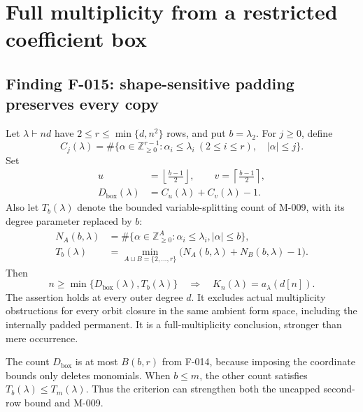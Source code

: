 \section{Full multiplicity from a restricted coefficient box}

\subsection*{Finding F-015: shape-sensitive padding preserves every copy}
Let \(\lambda\vdash nd\) have \(2\leq r\leq\min\{d,n^2\}\)
rows, and put \(b=\lambda_2\). For \(j\geq0\), define
\[
 C_j(\lambda)=\#\{\alpha\in\mathbb Z_{\geq0}^{r-1}:
       \alpha_i\leq\lambda_i\ (2\leq i\leq r),\quad
       |\alpha|\leq j\}.
\]
Set
\[
 \begin{split}
 u&=\left\lfloor\frac{b-1}{2}\right\rfloor,\qquad
 v=\left\lceil\frac{b-1}{2}\right\rceil,\\
 D_{\mathrm{box}}(\lambda)&=C_u(\lambda)+C_v(\lambda)-1.
 \end{split}
\]
Also let \(T_b(\lambda)\) denote the bounded variable-splitting
count of M-009, with its degree parameter replaced by \(b\):
\[
 \begin{split}
 N_A(b,\lambda)&=
 \#\{\alpha\in\mathbb Z_{\geq0}^{A}:\alpha_i\leq\lambda_i,
                                            |\alpha|\leq b\},\\
 T_b(\lambda)&=
 \min_{A\sqcup B=\{2,\ldots,r\}}
                  \bigl(N_A(b,\lambda)+N_B(b,\lambda)-1\bigr).
 \end{split}
\]
Then
\begin{equation}\label{eq:F015}
 n\geq\min\{D_{\mathrm{box}}(\lambda),T_b(\lambda)\}
 \quad\Longrightarrow\quad
                       K_n(\lambda)=a_\lambda(d[n]).
\end{equation}
The assertion holds at every outer degree \(d\). It excludes
actual multiplicity obstructions for every orbit closure in the
same ambient form space, including the internally padded permanent.
It is a full-multiplicity conclusion, stronger than mere occurrence.

The count \(D_{\mathrm{box}}\) is at most \(B(b,r)\) from F-014,
because imposing the coordinate bounds only deletes monomials.
When \(b\leq m\), the other count satisfies
\(T_b(\lambda)\leq T_m(\lambda)\). Thus the criterion can
strengthen both the uncapped second-row bound and M-009.

